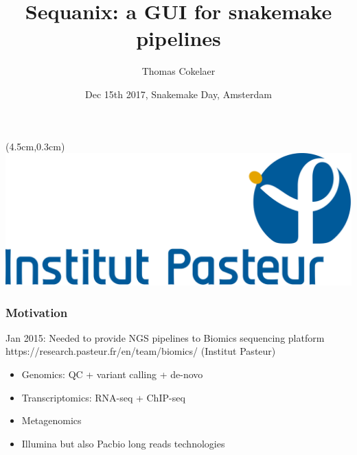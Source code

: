 \documentclass{beamer}
\title[Sequanix]{Sequanix: a GUI for snakemake pipelines}
\author[T. Cokelaer]{Thomas Cokelaer}
\institute{Institut Pasteur}
\date{Dec 15th 2017, Snakemake Day, Amsterdam}
\begin{document}

\begin{frame}[plain]
    \titlepage
    \begin{textblock*}{5cm}(4.5cm,0.3cm)
        \includegraphics[scale=0.09]{images/Institut_Pasteur.png}
    \end{textblock*}
\end{frame}


\begin{frame}
\frametitle{Motivation}
\begin{block}{Jan 2015: Needed to provide NGS pipelines to Biomics sequencing platform 
https://research.pasteur.fr/en/team/biomics/ (Institut Pasteur)}
 \begin{itemize}
  \item Genomics: QC + variant calling + de-novo
  \item Transcriptomics: RNA-seq + ChIP-seq 
  \item Metagenomics
  \item Illumina but also Pacbio long reads technologies
 \end{itemize}
\end{block} 
\end{frame}
\end{document}
